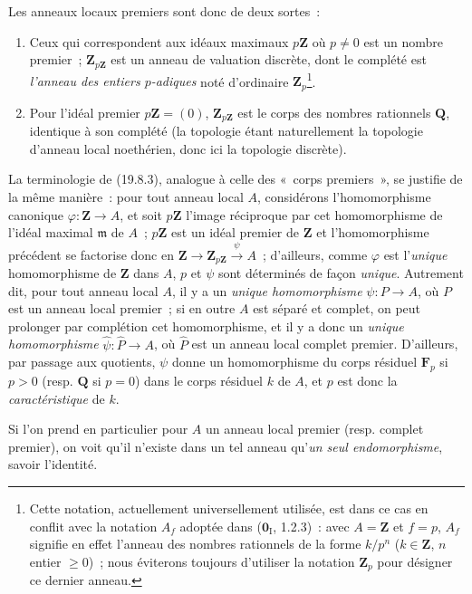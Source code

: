 \documentclass[10pt,oneside]{book}
\begin{document}
Les anneaux locaux premiers sont donc de deux sortes~:
\begin{enumerate}
  \item[$1^{\mathrm o}$] Ceux qui correspondent aux idéaux maximaux
  $p\mathbf Z$ où $p\neq0$ est un nombre premier~; $\mathbf Z_{p\mathbf Z}$
  est un anneau de valuation discrète, dont le complété est \emph{l'anneau des
  entiers $p$-adiques} noté d'ordinaire $\mathbf Z_p$\footnote{Cette notation,
  actuellement universellement utilisée, est dans ce cas en conflit avec la
  notation $A_f$ adoptée dans ($\mathbf 0_{\mathrm I}$, 1.2.3)~: avec
  $A=\mathbf Z$ et $f=p$, $A_f$ signifie en effet l'anneau des nombres
  rationnels de la forme $k/p^n$ ($k\in\mathbf Z$, $n$ entier $\geq0$)~; nous
  éviterons toujours d'utiliser la notation $\mathbf Z_p$ pour désigner ce
  dernier anneau.}.
  \item[$2^{\mathrm o}$] Pour l'idéal premier $p\mathbf Z=(0)$,
  $\mathbf Z_{p\mathbf Z}$ est le corps des nombres rationnels $\mathbf Q$,
  identique à son complété (la topologie étant naturellement la topologie
  d'anneau local noethérien, donc ici la topologie discrète).
\end{enumerate}

La terminologie de (19.8.3), analogue à celle des «~corps premiers~», se
justifie de la même manière~: pour tout anneau local $A$, considérons
l'homomorphisme canonique $\varphi:\mathbf Z\to A$, et soit $p\mathbf Z$
l'image réciproque par cet homomorphisme de l'idéal maximal $\mathfrak m$ de
$A$~; $p\mathbf Z$ est un idéal premier de $\mathbf Z$ et l'homomorphisme
précédent se factorise donc en
$\mathbf Z\to\mathbf Z_{p\mathbf Z}\xrightarrow{\psi}A$~; d'ailleurs, comme
$\varphi$ est l'\emph{unique} homomorphisme de $\mathbf Z$ dans $A$, $p$ et
$\psi$ sont déterminés de façon \emph{unique}. Autrement dit, pour tout anneau
local $A$, il y a un \emph{unique homomorphisme} $\psi:P\to A$, où $P$ est un
anneau local premier~; si en outre $A$ est séparé et complet, on peut prolonger
par complétion cet homomorphisme, et il y a donc un \emph{unique
homomorphisme} $\widehat\psi:\widehat P\to A$, où $\widehat P$ est un anneau
local complet premier. D'ailleurs, par passage aux quotients, $\psi$ donne un
homomorphisme du corps résiduel $\mathbf F_p$ si $p>0$ (resp. $\mathbf Q$ si
$p=0$) dans le corps résiduel $k$ de $A$, et $p$ est donc la
\emph{caractéristique} de $k$.

Si l'on prend en particulier pour $A$ un anneau local premier (resp. complet
premier), on voit qu'il n'existe dans un tel anneau qu'\emph{un seul
endomorphisme}, savoir l'identité.
\end{document}
